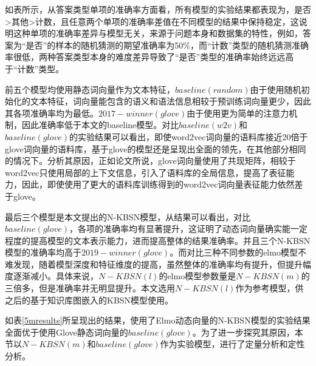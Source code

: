 如表所示，从答案类型单项的准确率方面看，所有模型的实验结果都表现为，是否>其他>计数，且任意两个单项的准确率差值在不同模型的结果中保持稳定，这说明这种单项的准确率差异与模型无关，来源于问题本身和数据集的特性，例如，答案为“是否”的样本的随机猜测的期望准确率为50\%，而“计数”类型的随机猜测准确率很低，两种答案类型本身的难度差异导致了“是否”类型的准确率始终远远高于“计数”类型。

前五个模型均使用静态词向量作为文本特征，$baseline(random)$由于使用随机初始化的文本特征，词向量能包含的语义和语法信息相较于预训练词向量更少，因此其各项准确率均为最低。$2017-winner(glove)$由于使用更为简单的注意力机制，因此准确率低于本文的baseline模型。对比$baseline(w2v)$和$baseline(glove)$的实验结果可以看出，即使word2vec词向量的语料库接近20倍于glove词向量的语料库，基于glove的模型还是呈现出全面的领先，在其他部分相同的情况下。分析其原因，正如论文\cite{pennington2014glove}所说，glove词向量使用了共现矩阵，相较于word2vec只使用局部的上下文信息，引入了语料库的全局信息，提高了表征能力，因此，即使使用了更大的语料库训练得到的word2vec词向量表征能力依然差于glove。

最后三个模型是本文提出的N-KBSN模型，从结果可以看出，对比$baseline(glove)$，各项的准确率均有显著提升，这证明了动态词向量确实能一定程度的提高模型的文本表示能力，进而提高整体的结果准确率。并且三个N-KBSN模型的准确率均高于$2019-winner(glove)$。而对比三种不同参数的elmo模型不难发现，随着模型深度和特征维度的提高，虽然整体的准确率均有提升，但提升幅度逐渐减小。具体来说，$N-KBSN(l)$的elmo模型参数量是$N-KBSN(m)$的三倍多，但是准确率并无明显提升。本文选用$N-KBSN(l)$作为参考模型，供之后的基于知识库图嵌入的KBSN模型使用。

如表\ref{5mresults}所呈现出的结果，使用了Elmo动态向量的N-KBSN模型的实验结果全面优于使用Glove静态词向量的$baseline(glove)$。为了进一步探究其原因，本节以$N-KBSN(m)$和$baseline(glove)$作为实验模型，进行了定量分析和定性分析。

